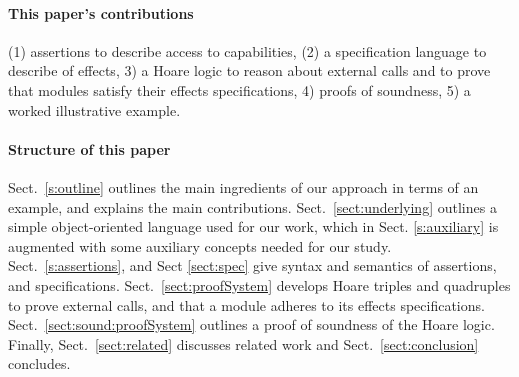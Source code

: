 

\paragraph{This paper's contributions} %
{(1) assertions to describe   access to capabilities}, 
(2) a specification language to describe \taming of effects,
3) a Hoare logic to reason about external calls and to prove that modules satisfy their \tamed effects specifications,
4)  proofs of soundness,
5) a worked illustrative example.
 

 \paragraph{Structure of this paper}
Sect.\ \ref{s:outline}   outlines the main ingredients of our approach in terms of an example, and explains the main contributions.
Sect.\ \ref{sect:underlying} outlines a simple object-oriented language used for our work, which in Sect. \ref{s:auxiliary} is augmented with some auxiliary concepts needed for our study.
Sect.\ \ref{s:assertions}, and Sect \ref{sect:spec}  give syntax and semantics of  assertions, and  specifications.
Sect.\ \ref{sect:proofSystem} develops Hoare triples and quadruples to prove external calls, and that a module adheres to its \tamed effects specifications.
Sect.\ \ref{sect:sound:proofSystem} outlines a proof of soundness of
the Hoare logic. Finally, Sect.\ \ref{sect:related} discusses related
work and Sect.\ \ref{sect:conclusion} concludes. 
 
